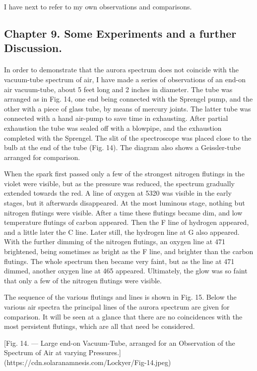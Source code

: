 \documentclass[a4paper, 12pt, oneside, polutonikogreek, english]{article}
\begin{document}
I have next to refer to my own observations and comparisons.
\clearpage
\subsection{Chapter 9. Some Experiments and a further Discussion.}
\paragraph{}
In order to demonstrate that the aurora spectrum does not coincide with the vacuum-tube spectrum of air, I have made a series of observations of an end-on air vacuum-tube, about 5 feet long and 2 inches in diameter. The tube was arranged as in Fig. 14, one end being connected with the Sprengel pump, and the other with a piece of glass tube, by means of mercury joints. The latter tube was connected with a hand air-pump to save time in exhausting. After partial exhaustion the tube was sealed off with a blowpipe, and the exhaustion completed with the Sprengel. The slit of the spectroscope was placed close to the bulb at the end of the tube (Fig. 14). The diagram also shows a Geissler-tube arranged for comparison.

When the spark first passed only a few of the strongest nitrogen flutings in the violet were visible, but as the pressure was reduced, the spectrum gradually extended towards the red. A line of oxygen at 5320 was visible in the early stages, but it afterwards disappeared. At the most luminous stage, nothing but nitrogen flutings were visible. After a time these flutings became dim, and low temperature flutings of carbon appeared. Then the F line of hydrogen appeared, and a little later the C line. Later still, the hydrogen line at G also appeared. With the further dimming of the nitrogen flutings, an oxygen line at 471 brightened, being sometimes as bright as the F line, and brighter than the carbon flutings. The whole spectrum then became very faint, but as the line at 471 dimmed, another oxygen line at 465 appeared. Ultimately, the glow was so faint that only a few of the nitrogen flutings were visible.

The sequence of the various flutings and lines is shown in Fig. 15. Below the various air spectra the principal lines of the aurora spectrum are given for comparison. It will be seen at a glance that there are no coincidences with the most persistent flutings, which are all that need be considered.

[Fig. 14. --- Large end-on Vacuum-Tube, arranged for an Observation of the Spectrum of Air at varying Pressures.](https://cdn.solaranamnesis.com/Lockyer/Fig-14.jpeg)
\end{document}
